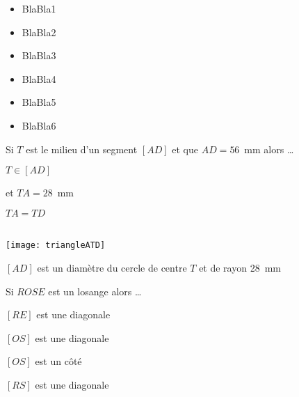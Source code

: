 \begin{acquis} %
\begin{itemize}
\item BlaBla1
\item BlaBla2
\item BlaBla3
\item BlaBla4
\item BlaBla5
\item BlaBla6
\end{itemize}
\end{acquis}


\begin{QCM}
  \begin{GroupeQCM}
    \begin{exercice}
      Si $T$ est le milieu d'un segment $[AD]$ et que $AD = 56$ mm alors \ldots
      \begin{ChoixQCM}{4}
      \item $T \in [AD]$
      
      et $TA = 28$ mm
      \item $TA = TD$
      \item \\[-1em]
      \texttt{[image: triangleATD]}
      \item $[AD]$ est un diamètre du cercle de centre $T$ et de rayon 28 mm
      \end{ChoixQCM}
\begin{corrige}
   \end{corrige}
    \end{exercice}

  \begin{exercice}
      Si $ROSE$ est un losange alors \ldots
      \begin{ChoixQCM}{4}
      \item $[RE]$ est une diagonale
      \item $[OS]$ est une diagonale
      \item $[OS]$ est un côté
      \item $[RS]$ est une diagonale
      \end{ChoixQCM}
\begin{corrige}
   \end{corrige}
    \end{exercice}


\end{GroupeQCM}
\end{QCM}

  